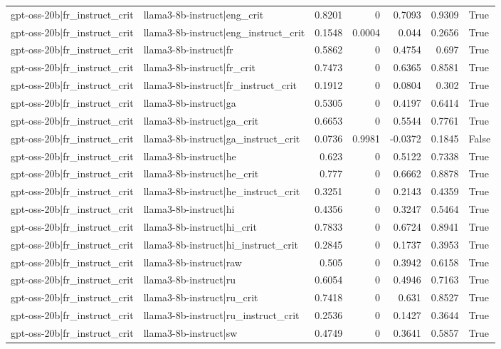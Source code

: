 \begin{table}
\begin{tabular}{l l r r r r l}
gpt-oss-20b|fr_instruct_crit & llama3-8b-instruct|eng_crit & 0.8201 & 0 & 0.7093 & 0.9309 & True \\
gpt-oss-20b|fr_instruct_crit & llama3-8b-instruct|eng_instruct_crit & 0.1548 & 0.0004 & 0.044 & 0.2656 & True \\
gpt-oss-20b|fr_instruct_crit & llama3-8b-instruct|fr & 0.5862 & 0 & 0.4754 & 0.697 & True \\
gpt-oss-20b|fr_instruct_crit & llama3-8b-instruct|fr_crit & 0.7473 & 0 & 0.6365 & 0.8581 & True \\
gpt-oss-20b|fr_instruct_crit & llama3-8b-instruct|fr_instruct_crit & 0.1912 & 0 & 0.0804 & 0.302 & True \\
gpt-oss-20b|fr_instruct_crit & llama3-8b-instruct|ga & 0.5305 & 0 & 0.4197 & 0.6414 & True \\
gpt-oss-20b|fr_instruct_crit & llama3-8b-instruct|ga_crit & 0.6653 & 0 & 0.5544 & 0.7761 & True \\
gpt-oss-20b|fr_instruct_crit & llama3-8b-instruct|ga_instruct_crit & 0.0736 & 0.9981 & -0.0372 & 0.1845 & False \\
gpt-oss-20b|fr_instruct_crit & llama3-8b-instruct|he & 0.623 & 0 & 0.5122 & 0.7338 & True \\
gpt-oss-20b|fr_instruct_crit & llama3-8b-instruct|he_crit & 0.777 & 0 & 0.6662 & 0.8878 & True \\
gpt-oss-20b|fr_instruct_crit & llama3-8b-instruct|he_instruct_crit & 0.3251 & 0 & 0.2143 & 0.4359 & True \\
gpt-oss-20b|fr_instruct_crit & llama3-8b-instruct|hi & 0.4356 & 0 & 0.3247 & 0.5464 & True \\
gpt-oss-20b|fr_instruct_crit & llama3-8b-instruct|hi_crit & 0.7833 & 0 & 0.6724 & 0.8941 & True \\
gpt-oss-20b|fr_instruct_crit & llama3-8b-instruct|hi_instruct_crit & 0.2845 & 0 & 0.1737 & 0.3953 & True \\
gpt-oss-20b|fr_instruct_crit & llama3-8b-instruct|raw & 0.505 & 0 & 0.3942 & 0.6158 & True \\
gpt-oss-20b|fr_instruct_crit & llama3-8b-instruct|ru & 0.6054 & 0 & 0.4946 & 0.7163 & True \\
gpt-oss-20b|fr_instruct_crit & llama3-8b-instruct|ru_crit & 0.7418 & 0 & 0.631 & 0.8527 & True \\
gpt-oss-20b|fr_instruct_crit & llama3-8b-instruct|ru_instruct_crit & 0.2536 & 0 & 0.1427 & 0.3644 & True \\
gpt-oss-20b|fr_instruct_crit & llama3-8b-instruct|sw & 0.4749 & 0 & 0.3641 & 0.5857 & True \\

\end{tabular}
\end{table}

